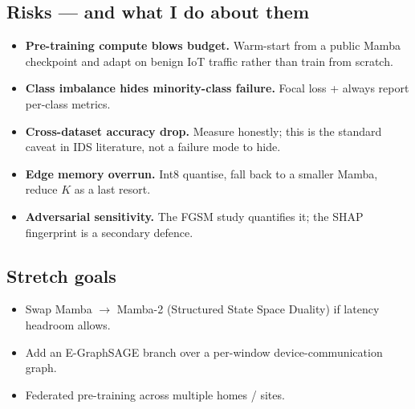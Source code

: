 \documentclass[11pt,a4paper]{article}
\begin{document}
\subsection{Risks --- and what I do about them}
\begin{tcolorbox}[warnbox]
\begin{itemize}[leftmargin=*, itemsep=1pt, topsep=0pt]
  \item \textbf{Pre-training compute blows budget.} Warm-start from a public Mamba checkpoint and adapt on benign IoT traffic rather than train from scratch.
  \item \textbf{Class imbalance hides minority-class failure.} Focal loss + always report per-class metrics.
  \item \textbf{Cross-dataset accuracy drop.} Measure honestly; this is the standard caveat in IDS literature, not a failure mode to hide.
  \item \textbf{Edge memory overrun.} Int8 quantise, fall back to a smaller Mamba, reduce $K$ as a last resort.
  \item \textbf{Adversarial sensitivity.} The FGSM study quantifies it; the SHAP fingerprint is a secondary defence.
\end{itemize}
\end{tcolorbox}

\subsection{Stretch goals}
\begin{itemize}[leftmargin=*, itemsep=1pt]
  \item Swap Mamba $\to$ Mamba-2 (Structured State Space Duality) if latency headroom allows.
  \item Add an E-GraphSAGE branch over a per-window device-communication graph.
  \item Federated pre-training across multiple homes / sites.
\end{itemize}

\end{document}
